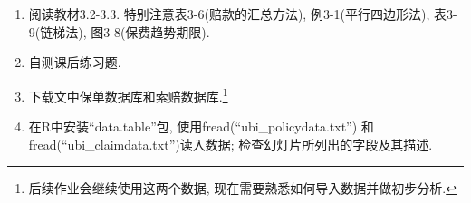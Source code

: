 \documentclass[professionalfont]{beamer}
\begin{document}
\section*{}
\begin{frame}
\begin{enumerate}
	\item 阅读教材3.2-3.3. 特别注意表3-6(赔款的汇总方法), 例3-1(平行四边形法), 表3-9(链梯法), 图3-8(保费趋势期限). 
	\item 自测课后练习题.
	\item 下载文中保单数据库和索赔数据库.\footnote{后续作业会继续使用这两个数据, 现在需要熟悉如何导入数据并做初步分析.} 
	\item 在R中安装``data.table''包, 使用fread(``ubi\_policydata.txt'') 和 fread(``ubi\_claimdata.txt'')读入数据; 检查幻灯片所列出的字段及其描述.
	
\end{enumerate}

\end{frame}
\end{document}

